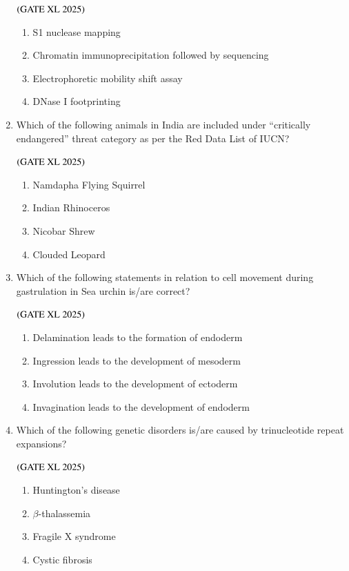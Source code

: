 \documentclass[journal]{IEEEtran}
\begin{document}
\begin{enumerate}
    \hfill $\left(\text{GATE XL 2025}\right)$
    \begin{enumerate}
        \item S1 nuclease mapping
        \item Chromatin immunoprecipitation followed by sequencing
        \item Electrophoretic mobility shift assay
        \item DNase I footprinting
    \end{enumerate}

    \item Which of the following animals in India are included under ``critically endangered'' threat category as per the Red Data List of IUCN?

    \hfill $\left(\text{GATE XL 2025}\right)$
    \begin{enumerate}
        \item Namdapha Flying Squirrel
        \item Indian Rhinoceros
        \item Nicobar Shrew
        \item Clouded Leopard
    \end{enumerate}

    \item Which of the following statements in relation to cell movement during gastrulation in Sea urchin is/are correct?

    \hfill $\left(\text{GATE XL 2025}\right)$
    \begin{enumerate}
        \item Delamination leads to the formation of endoderm
        \item Ingression leads to the development of mesoderm
        \item Involution leads to the development of ectoderm
        \item Invagination leads to the development of endoderm
    \end{enumerate}

    \item Which of the following genetic disorders is/are caused by trinucleotide repeat expansions?

    \hfill $\left(\text{GATE XL 2025}\right)$
    \begin{enumerate}
        \item Huntington's disease
        \item $\beta$-thalassemia
        \item Fragile X syndrome
        \item Cystic fibrosis
    \end{enumerate}


\end{enumerate}
\end{document}
